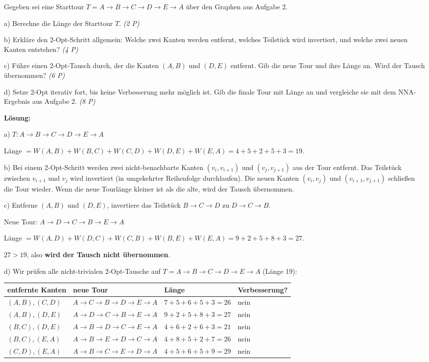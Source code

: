 \documentclass[11pt, a4paper]{article}
\begin{document}
Gegeben sei eine Starttour $T = A\to B\to C\to D\to E\to A$ über den Graphen aus Aufgabe 2.


a) Berechne die Länge der Starttour $T$. \textit{(2 P)}


b) Erkläre den 2-Opt-Schritt allgemein: Welche zwei Kanten werden entfernt, welches Teilstück wird invertiert, und welche zwei neuen Kanten entstehen? \textit{(4 P)}


c) Führe einen 2-Opt-Tausch durch, der die Kanten $(A,B)$ und $(D,E)$ entfernt. Gib die neue Tour und ihre Länge an. Wird der Tausch übernommen? \textit{(6 P)}


d) Setze 2-Opt iterativ fort, bis keine Verbesserung mehr möglich ist. Gib die finale Tour mit Länge an und vergleiche sie mit dem NNA-Ergebnis aus Aufgabe 2. \textit{(8 P)}


\textbf{Lösung:}


a) $T: A\to B\to C\to D\to E\to A$

Länge $= W(A,B)+W(B,C)+W(C,D)+W(D,E)+W(E,A) = 4+5+2+5+3 = 19$.


b) Bei einem 2-Opt-Schritt werden zwei nicht-benachbarte Kanten $(v_i,v_{i+1})$ und $(v_j,v_{j+1})$ aus der Tour entfernt. Das Teilstück zwischen $v_{i+1}$ und $v_j$ wird invertiert (in umgekehrter Reihenfolge durchlaufen). Die neuen Kanten $(v_i,v_j)$ und $(v_{i+1},v_{j+1})$ schließen die Tour wieder. Wenn die neue Tourlänge kleiner ist als die alte, wird der Tausch übernommen.


c) Entferne $(A,B)$ und $(D,E)$, invertiere das Teilstück $B\to C\to D$ zu $D\to C\to B$.

Neue Tour: $A\to D\to C\to B\to E\to A$

Länge $= W(A,D)+W(D,C)+W(C,B)+W(B,E)+W(E,A) = 9+2+5+8+3 = 27$.


$27 > 19$, also \textbf{wird der Tausch nicht übernommen}.


d) Wir prüfen alle nicht-trivialen 2-Opt-Tausche auf $T = A\to B\to C\to D\to E\to A$ (Länge 19):



{\small
\begin{tabularx}{\linewidth}{XXXX}
\hline
\rowcolor{tableheadbg}
{\color{white}\textbf{entfernte Kanten}} & {\color{white}\textbf{neue Tour}} & {\color{white}\textbf{Länge}} & {\color{white}\textbf{Verbesserung?}} \\[2pt]
\hline
\endhead
\hline
\endfoot
$(A,B),(C,D)$ & $A\to C\to B\to D\to E\to A$ & $7+5+6+5+3=26$ & nein \\
$(A,B),(D,E)$ & $A\to D\to C\to B\to E\to A$ & $9+2+5+8+3=27$ & nein \\
$(B,C),(D,E)$ & $A\to B\to D\to C\to E\to A$ & $4+6+2+6+3=21$ & nein \\
$(B,C),(E,A)$ & $A\to B\to E\to D\to C\to A$ & $4+8+5+2+7=26$ & nein \\
$(C,D),(E,A)$ & $A\to B\to C\to E\to D\to A$ & $4+5+6+5+9=29$ & nein \\
\end{tabularx}
}
\end{document}
